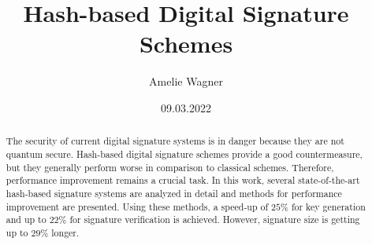 \documentclass[ngerman,BCOR=4mm, english]{tudscrreprt}
\newcommand{\?}{\stackrel{?}{=}} %
\begin{document}
\date{09.03.2022}
\title{%
  Hash-based Digital Signature Schemes
}
\subject{master}
\author{%
  Amelie Wagner%
}
\maketitle %



\begin{otherlanguage}{ngerman} %
\confirmation
\end{otherlanguage}

\begin{abstract}
The security of current digital signature systems is in danger because they are not quantum secure. Hash-based digital signature schemes provide a good  countermeasure, but they generally perform worse in comparison to classical schemes. Therefore, performance improvement remains a crucial task.  
In this work, several state-of-the-art hash-based signature systems are analyzed in detail and methods for performance improvement are presented.
Using these methods, a speed-up of $25\%$ for key generation and up to $22\%$ for signature verification is achieved. However, signature size is getting up to $29\%$ longer.
\end{abstract}

\tableofcontents







\appendix 





\end{document}
